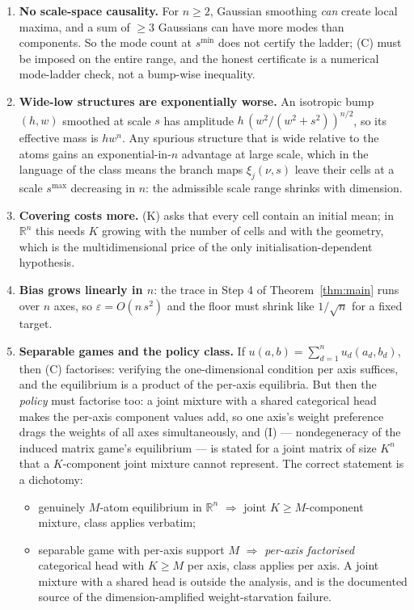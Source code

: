 \documentclass[11pt]{article}
\theoremstyle{definition}
\newcommand{\R}{\mathbb{R}}
\begin{document}
\begin{enumerate}
\item \textbf{No scale-space causality.} For $n \ge 2$, Gaussian smoothing
  \emph{can} create local maxima, and a sum of $\ge 3$ Gaussians can have more
  modes than components. So the mode count at $s^{\min}$ does not certify the
  ladder; (C) must be imposed on the entire range, and the honest certificate is
  a numerical mode-ladder check, not a bump-wise inequality.
\item \textbf{Wide-low structures are exponentially worse.} An isotropic bump
  $(h,w)$ smoothed at scale $s$ has amplitude $h\,(w^2/(w^2+s^2))^{n/2}$, so its
  effective mass is $h w^n$. Any spurious structure that is wide relative to the
  atoms gains an exponential-in-$n$ advantage at large scale, which in the
  language of the class means the branch maps $\xi_j(\nu,s)$ leave their cells at
  a scale $s^{\max}$ decreasing in $n$: the admissible scale range shrinks with
  dimension.
\item \textbf{Covering costs more.} (K) asks that every cell contain an initial
  mean; in $\R^n$ this needs $K$ growing with the number of cells and with the
  geometry, which is the multidimensional price of the only
  initialisation-dependent hypothesis.
\item \textbf{Bias grows linearly in $n$}: the trace in Step 4 of
  Theorem~\ref{thm:main} runs over $n$ axes, so $\varepsilon = O(n\,s^2)$ and the
  floor must shrink like $1/\sqrt n$ for a fixed target.
\item \textbf{Separable games and the policy class.} If
  $u(a,b) = \sum_{d=1}^{n} u_d(a_d, b_d)$, then (C) factorises: verifying the
  one-dimensional condition per axis suffices, and the equilibrium is a product
  of the per-axis equilibria. But then the \emph{policy} must factorise too: a
  joint mixture with a shared categorical head makes the per-axis component
  values add, so one axis's weight preference drags the weights of all axes
  simultaneously, and (I) --- nondegeneracy of the induced matrix game's equilibrium
  --- is stated for a joint matrix of size $K^n$ that a $K$-component joint
  mixture cannot represent. The correct statement is a dichotomy:
  \begin{itemize}
  \item genuinely $M$-atom equilibrium in $\R^n$ $\Rightarrow$ joint
    $K \ge M$-component mixture, class applies verbatim;
  \item separable game with per-axis support $M$ $\Rightarrow$ \emph{per-axis
    factorised} categorical head with $K \ge M$ per axis, class applies per axis.
    A joint mixture with a shared head is outside the analysis, and is the
    documented source of the dimension-amplified weight-starvation failure.
  \end{itemize}
\end{enumerate}
\end{document}
